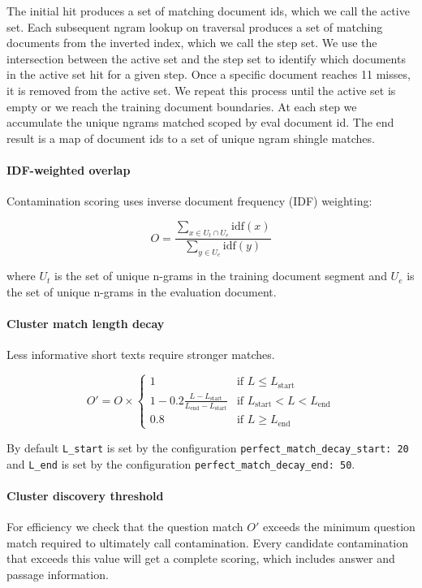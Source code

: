 \documentclass[table]{ai2style/ai2}
\begin{document}
{{The initial hit produces a set of matching document ids, which we call the active set. Each subsequent ngram lookup on traversal produces a set of matching documents from the inverted index, which we call the step set. We use the intersection between the active set and the step set to identify which documents in the active set hit for a given step. Once a specific document reaches 11 misses, it is removed from the active set. We repeat this process until the active set is empty or we reach the training document boundaries. At each step we accumulate the unique ngrams matched scoped by eval document id. The end result is a map of document ids to a set of unique ngram shingle matches.

\paragraph{IDF-weighted overlap}
Contamination scoring uses inverse document frequency (IDF) weighting:

\begin{equation*}
O = \frac{\sum_{x \in U_t \cap U_e} \text{idf}(x)}{\sum_{y \in U_e} \text{idf}(y)}
\end{equation*}

where $U_t$ is the set of unique n-grams in the training document segment and $U_e$ is the set of unique n-grams in the evaluation document.

\paragraph{Cluster match length decay} Less informative short texts require stronger matches.

\begin{equation*}
O' = O \times \begin{cases} 1 & \text{if } L \le L_\text{start} \\ 1 - 0.2 \frac{L - L_\text{start}}{L_\text{end} - L_\text{start}} & \text{if } L_\text{start} < L < L_\text{end} \\ 0.8 & \text{if } L \ge L_\text{end} \end{cases}
\end{equation*}

By default \texttt{L\_start} is set by the configuration \texttt{perfect\_match\_decay\_start: 20} and \texttt{L\_end} is set by the configuration \texttt{perfect\_match\_decay\_end: 50}.

\paragraph{Cluster discovery threshold} For efficiency we check that the question match $O'$ exceeds the minimum question match required to ultimately call contamination. Every candidate contamination that exceeds this value will get a complete scoring, which includes answer and passage information.

}}
\end{document}
